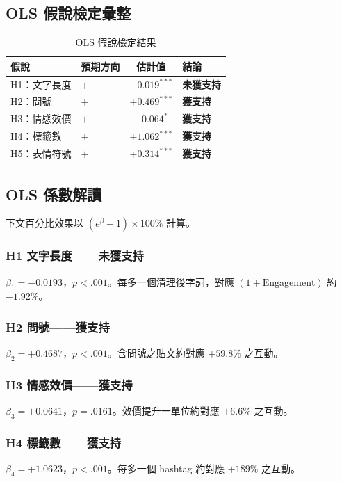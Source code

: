 \documentclass[12pt,a4paper]{ctexart}
\begin{document}
\subsection{OLS 假說檢定彙整}

\begin{table}[H]
\centering
\caption{OLS 假說檢定結果}
\small
\begin{tabular}{llcl}
\toprule
假說 & 預期方向 & 估計值 & 結論 \\
\midrule
H1：文字長度 & $+$ & $-0.019^{***}$ & \textbf{未獲支持} \\
H2：問號 & $+$ & $+0.469^{***}$ & \textbf{獲支持} \\
H3：情感效價 & $+$ & $+0.064^{*}$ & \textbf{獲支持} \\
H4：標籤數 & $+$ & $+1.062^{***}$ & \textbf{獲支持} \\
H5：表情符號 & $+$ & $+0.314^{***}$ & \textbf{獲支持} \\
\bottomrule
\end{tabular}
\end{table}

\subsection{OLS 係數解讀}

下文百分比效果以 $(e^{\beta}-1)\times 100\%$ 計算。

\subsubsection*{H1 文字長度——未獲支持}
$\beta_1 = -0.0193$，$p<.001$。每多一個清理後字詞，對應 $(1+\text{Engagement})$ 約 $-1.92\%$。

\subsubsection*{H2 問號——獲支持}
$\beta_2 = +0.4687$，$p<.001$。含問號之貼文約對應 $+59.8\%$ 之互動。

\subsubsection*{H3 情感效價——獲支持}
$\beta_3 = +0.0641$，$p=.0161$。效價提升一單位約對應 $+6.6\%$ 之互動。

\subsubsection*{H4 標籤數——獲支持}
$\beta_4 = +1.0623$，$p<.001$。每多一個 hashtag 約對應 $+189\%$ 之互動。
\end{document}
